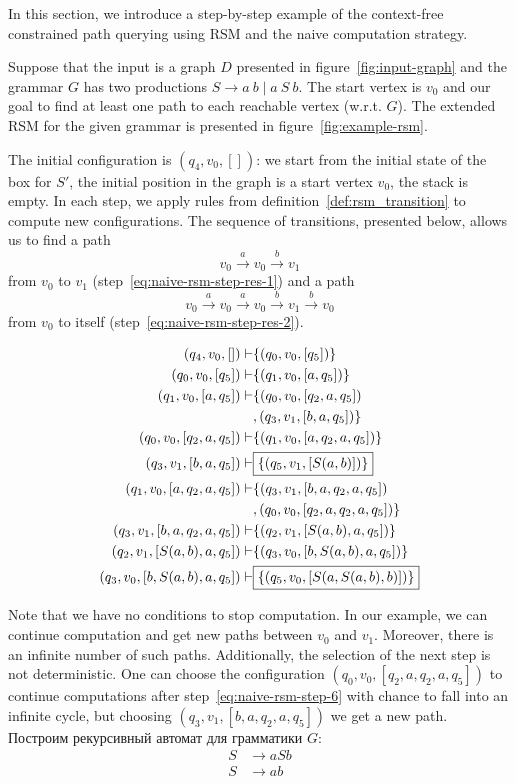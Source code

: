 In this section, we introduce a step-by-step example of the context-free constrained path querying using RSM and the naive computation strategy. 

Suppose that the input is a graph $D$ presented in figure~\ref{fig:input-graph} and the grammar  $G$ has two productions $S \to a \ b \mid a \ S \ b$. The start vertex is $v_0$ and our goal to find at least one path to each reachable vertex (w.r.t. $G$). The extended RSM for the given grammar is presented in figure~\ref{fig:example-rsm}. 

The initial configuration is $(q_4,v_0,[])$: we start from the initial state of the box for $S'$, the initial position in the graph is a start vertex $v_0$, the stack is empty. In each step, we apply rules from definition~\ref{def:rsm_transition} to compute new configurations. The sequence of transitions, presented below, allows us to find a path $$v_0 \xrightarrow{a} v_0 \xrightarrow{b} v_1$$
from $v_0$ to $v_1$ (step~\ref{eq:naive-rsm-step-res-1}) and a path 
$$v_0 \xrightarrow{a} v_0 \xrightarrow{a} v_0 \xrightarrow{b} v_1 \xrightarrow{b} v_0$$
from $v_0$ to itself (step~\ref{eq:naive-rsm-step-res-2}). 

\begin{align}
\setcounter{equation}{0}
(q_4,v_0,[])     \vdash & \{(q_0,v_0,[q_5])\} \\
(q_0,v_0,[q_5])  \vdash & \{(q_1,v_0,[a,q_5])\} \\
(q_1,v_0,[a,q_5])\vdash & \{(q_0,v_0,[q_2,a,q_5]) \nonumber\\ 
                        & , (q_3,v_1,[b,a,q_5])\} \\
(q_0,v_0,[q_2,a,q_5]) \vdash & \{(q_1,v_0,[a,q_2,a,q_5])\} \\
(q_3,v_1,[b,a,q_5])   \vdash & \boxed{\{(q_5,v_1,[S(a,b)])\}} \label{eq:naive-rsm-step-res-1}\\
(q_1,v_0,[a,q_2,a,q_5]) \vdash & \{(q_3,v_1,[b,a,q_2,a,q_5]) \nonumber \\
                               & , (q_0,v_0,[q_2,a,q_2,a,q_5])\} \label{eq:naive-rsm-step-6} \\
(q_3,v_1,[b,a,q_2,a,q_5]) \vdash & \{(q_2,v_1,[S(a,b),a,q_5])\} \\
(q_2,v_1,[S(a,b),a,q_5]) \vdash & \{(q_3,v_0,[b,S(a,b),a,q_5])\} \\
(q_3,v_0,[b,S(a,b),a,q_5]) \vdash & \boxed{\{(q_5,v_0,[S(a,S(a,b),b)])\}} \label{eq:naive-rsm-step-res-2}
\end{align}

Note that we have no conditions to stop computation. In our example, we can continue computation and get new paths between $v_0$ and $v_1$. Moreover, there is an infinite number of such paths. Additionally, the selection of the next step is not deterministic. One can choose the configuration $(q_0,v_0,[q_2,a,q_2,a,q_5])$ to continue computations after step~\ref{eq:naive-rsm-step-6} with chance to fall into an infinite cycle, but choosing $(q_3,v_1,[b,a,q_2,a,q_5])$ we get a new path.
Построим рекурсивный автомат для грамматики $G$:
\begin{align*}
    S & \to    a S b \\
    S & \to    a b
\end{align*}

